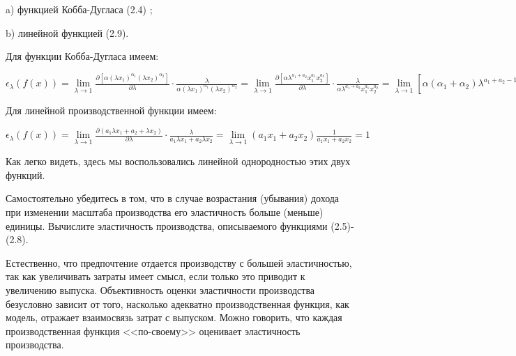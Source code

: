 \documentclass[12pt, 4paper]{book}
\begin{document}
{a) функцией Кобба-Дугласа (2.4) ; 
\par
 
b) линейной функцией (2.9). 
\par

Для функции Кобба-Дугласа имеем: 
\begin{center}
$\epsilon_{\lambda}(f(x))=\lim\limits_{\lambda \rightarrow 1}\frac{\partial [\alpha(\lambda x_1)^{\alpha_{1}}(\lambda x_2)^{\alpha_2}]}{\partial \lambda}\cdot \frac{\lambda}{\alpha(\lambda x_1)^{\alpha_{1}}(\lambda x_2)^{\alpha_2}}=\lim\limits_{\lambda \rightarrow 1}\frac{\partial[\alpha \lambda^{a_1+a_2}x_{1}^{a_1}x_{2}^{a_2}]}{\partial \lambda}\cdot \frac{\lambda}{\alpha \lambda^{a_1+a_2}x_{1}^{a_1}x_{2}^{a_2}}=
\lim\limits_{\lambda \rightarrow 1}[ \alpha (\alpha_1+\alpha_2)\lambda^{a_1+a_2-1}x_{1}^{a_1}x_{2}^{a_2}\frac{1}{\alpha \lambda^{a_1+a_2-1}x_{1}^{a_1}x_{2}^{a_2}}]=\lim\limits_{\lambda \rightarrow 1}(a_1+a_2)=(a_1+a_2)=1$
\end{center}
\par

Для линейной производственной функции имеем:
\begin{center}
$\epsilon_{\lambda}(f(x))=\lim\limits_{\lambda \rightarrow 1}\frac{\partial (a_1 \lambda x_1 + a_2+\lambda x_2)}{\partial \lambda}\cdot \frac{\lambda}{a_1 \lambda x_1+a_2 \lambda x_2}= \lim\limits_{\lambda \rightarrow 1}(a_1 x_1 + a_2 x_2)\frac{1}{a_1 x_1 + a_2 x_2}=1$
\end{center}
\par

Как легко видеть, здесь мы воспользовались линейной однородностью этих двух функций. 
\par

Самостоятельно убедитесь в том, что в случае возрастания (убывания) дохода при изменении масштаба производства его эластичность больше (меньше) единицы. Вычислите эластичность производства, описываемого функциями (2.5)-(2.8). 
\par

Естественно, что предпочтение отдается производству с большей эластичностью, так как увеличивать затраты имеет смысл, если только это приводит к увеличению выпуска. Объективность оценки эластичности производства безусловно зависит от того, насколько адекватно производственная функция, как модель, отражает взаимосвязь затрат с выпуском. Можно говорить, что каждая производственная функция <<по-своему>> оценивает эластичность производства. 
\par

}
\end{document}

